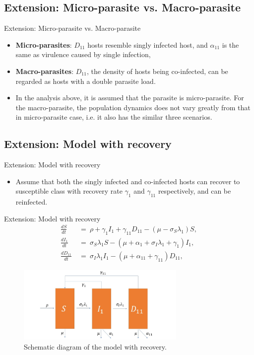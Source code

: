 \documentclass{beamer}
\begin{document}
	\subsection{Extension: Micro-parasite vs. Macro-parasite}
	\begin{frame}{Extension: Micro-parasite vs. Macro-parasite}
		\begin{itemize}
			\item \textbf{Micro-parasites}: $D_{11}$ hosts resemble singly infected host, and $\alpha_{11}$ is the same as virulence caused by single infection,
			\item \textbf{Macro-parasites}: $D_{11}$, the density of hosts being co-infected, can be regarded as hosts with a double parasite load.
			\vspace{1em}
			\item In the analysis above, it is assumed that the parasite is micro-parasite. For the macro-parasite, the population dynamics does not vary greatly from that in micro-parasite case, i.e. it also has the similar three scenarios.
		\end{itemize}
	\end{frame}

	\subsection{Extension: Model with recovery}
	\begin{frame}{Extension: Model with recovery}
		\begin{itemize}
			\item Assume that both the singly infected and co-infected hosts can recover to susceptible class with recovery rate $\gamma_1$ and $\gamma_{11}$ respectively, and can be reinfected.
		\end{itemize}
	\end{frame}

	\begin{frame}{Extension: Model with recovery}
		\begin{align}
			\frac{dS}{dt}\ &=\ \rho +\gamma_1I_1 + \gamma_{11}D_{11}-(\mu -\sigma_S\lambda_1)S,\\
			\frac{dI_1}{dt}\ &=\ \sigma_S\lambda_1S -(\mu + \alpha_1+\sigma_I\lambda_1+\gamma_1)I_1,\\
			\frac{dD_{11}}{dt}\ &=\ \sigma_I\lambda_1I_1 - (\mu+\alpha_{11}+\gamma_{11})D_{11},
		\end{align}
		\begin{figure}[ht]
			\label{Figure 11}
			\begin{center}
				\includegraphics[width=230pt]{model_with_recovery.jpg}
			\end{center}
			\caption{Schematic diagram of the model with recovery.}
		\end{figure}
	\end{frame}
\end{document}
